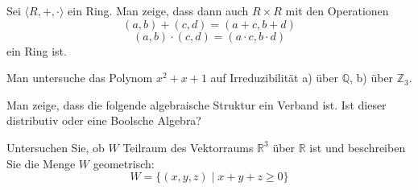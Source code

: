 \documentclass[a4paper, 12pt, margins=3cm]{homework}
\newcommand{\R}{\mathbb{R}}
\newcommand{\N}{\mathbb{N}}
\newcommand{\Z}{\mathbb{Z}}
\newcommand{\Q}{\mathbb{Q}}
\begin{document}
  \begin{problem}
    Sei $\langle R,+,\cdot\rangle$ ein Ring. Man zeige, dass dann auch $R\times R$
    mit den Operationen 
    \[ (a,b) + (c,d) = (a+c,b+d) \]
    \[ (a,b)\cdot (c,d) = (a\cdot c,b\cdot d) \]
    ein Ring ist.
  \end{problem}
  \begin{solution}
    
  \end{solution}


  \begin{problem}
    Man untersuche das Polynom $x^2 + x + 1$ auf Irreduzibilität a) über $\Q$,
    b) über $\Z_3$.
  \end{problem}
  \begin{solution}
    
  \end{solution}


  \begin{problem}
    Man zeige, dass die folgende algebraische Struktur ein Verband ist. Ist dieser
    distributiv oder eine Boolsche Algebra?
  \end{problem}
  \begin{solution}
    
  \end{solution}


  \begin{problem}
    Untersuchen Sie, ob $W$ Teilraum des Vektorraums $\R^3$ über $\R$ ist und
    beschreiben Sie die Menge $W$ geometrisch:
    \[ W = \{ (x,y,z) \;|\; x+y+z\geq 0 \} \]
  \end{problem}
  \begin{solution}
    
  \end{solution}
\end{document}

